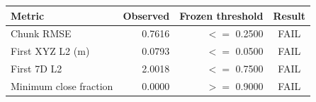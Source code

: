 \begin{tabular}{lrrc}
\toprule
Metric & Observed & Frozen threshold & Result \\
\midrule
Chunk RMSE & 0.7616 & $<=$ 0.2500 & FAIL \\
First XYZ L2 (m) & 0.0793 & $<=$ 0.0500 & FAIL \\
First 7D L2 & 2.0018 & $<=$ 0.7500 & FAIL \\
Minimum close fraction & 0.0000 & $>=$ 0.9000 & FAIL \\
\bottomrule
\end{tabular}
